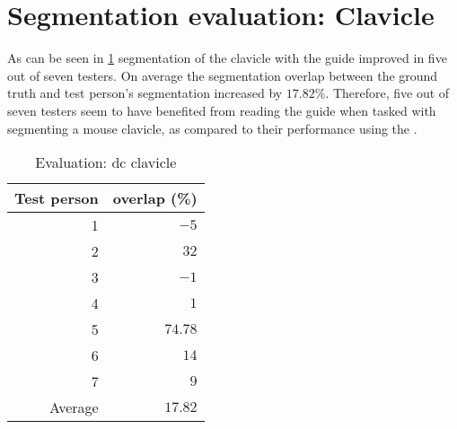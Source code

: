 \section{Segmentation evaluation: Clavicle}\label{s:seg-eval-clavicle}
As can be seen in \cref{tab:clavicle-overlap} segmentation of the clavicle with the guide improved in five out of seven testers.
On average the segmentation overlap between the ground truth and test person's segmentation increased by $17.82\%$.
Therefore, five out of seven testers seem to have benefited from reading the guide when tasked with segmenting a mouse 
clavicle, as compared to their performance using the .
\begin{table}[ht]
	\begin{center}
		\begin{tabular}{r r}
			\textbf{Test person} & \textbf{overlap (\%)} \\
			\hline
			1                    & $-5$                  \\
			2                    & $32$                  \\
			3                    & $-1$                  \\
			4                    & $1$                   \\
			5                    & $74.78$               \\
			6                    & $14$                  \\
			7                    & $9$                   \\
			\hline
			Average              & $17.82$               \\
		\end{tabular}
		\caption{Evaluation: \acrshort{dc} clavicle}\label{tab:clavicle-overlap}
	\end{center}
\end{table}

